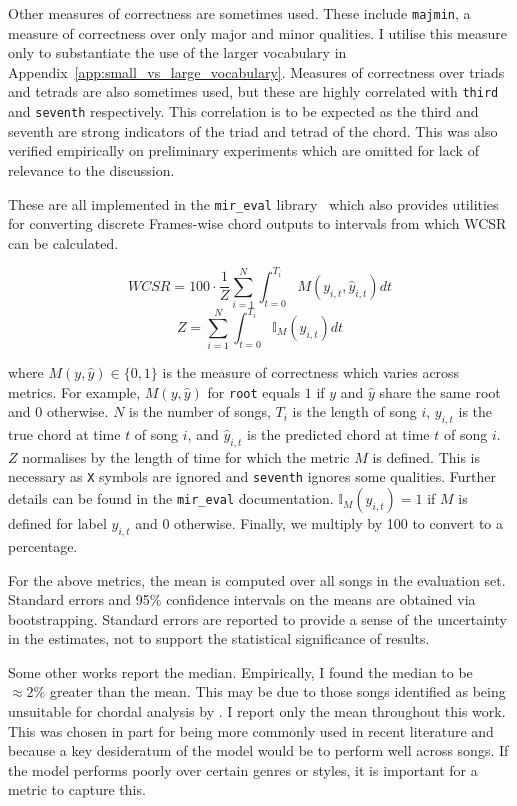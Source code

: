 Other measures of correctness are sometimes used. These include \texttt{majmin}, a measure of correctness over only major and minor qualities. I utilise this measure only to substantiate the use of the larger vocabulary in Appendix~\ref{app:small_vs_large_vocabulary}. Measures of correctness over triads and tetrads are also sometimes used, but these are highly correlated with \texttt{third} and \texttt{seventh} respectively. This correlation is to be expected as the third and seventh are strong indicators of the triad and tetrad of the chord. This was also verified empirically on preliminary experiments which are omitted for lack of relevance to the discussion.

These are all implemented in the \texttt{mir\_eval} library~\citep{mir_eval} which also provides utilities for converting discrete Frames-wise chord outputs to intervals from which WCSR can be calculated.

\begin{equation}\label{eq:wcsr}
    WCSR = 100\cdot\frac{1}{Z}\sum_{i=1}^{N} \int_{t=0}^{T_i} M(y_{i,t},\hat{y}_{i,t}) dt
\end{equation}
\begin{equation}
    Z = \sum_{i=1}^{N} \int_{t=0}^{T_i} \mathbb{I}_M(y_{i,t}) dt
\end{equation}

where $M(y, \hat{y})\in\{0,1\}$ is the measure of correctness which varies across metrics. For example, $M(y, \hat{y})$ for \texttt{root} equals $1$ if $y$ and $\hat{y}$ share the same root and $0$ otherwise. $N$ is the number of songs, $T_i$ is the length of song $i$, $y_{i,t}$ is the true chord at time $t$ of song $i$, and $\hat{y}_{i,t}$ is the predicted chord at time $t$ of song $i$. $Z$ normalises by the length of time for which the metric $M$ is defined. This is necessary as \texttt{X} symbols are ignored and \texttt{seventh} ignores some qualities. Further details can be found in the \texttt{mir\_eval} documentation. $\mathbb{I}_M(y_{i,t})=1$ if $M$ is defined for label $y_{i,t}$ and $0$ otherwise. Finally, we multiply by 100 to convert to a percentage.

For the above metrics, the mean is computed over all songs in the evaluation set. Standard errors and 95\% confidence intervals on the means are obtained via bootstrapping. Standard errors are reported to provide a sense of the uncertainty in the estimates, not to support the statistical significance of results.

Some other works report the median. Empirically, I found the median to be $\approx 2\%$ greater than the mean. This may be due to those songs identified as being unsuitable for chordal analysis by \citet{FourTimelyInsights}. I report only the mean throughout this work. This was chosen in part for being more commonly used in recent literature and because a key desideratum of the model would be to perform well across songs. If the model performs poorly over certain genres or styles, it is important for a metric to capture this.

